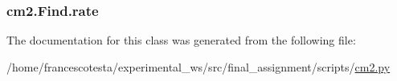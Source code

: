 \subsubsection[{\texorpdfstring{rate}{rate}}]{\setlength{\rightskip}{0pt plus 5cm}cm2.\+Find.\+rate\hspace{0.3cm}{\ttfamily [static]}}\hypertarget{classcm2_1_1Find_a7d73b556208fcf41081fb23ae0e1b262}{}\label{classcm2_1_1Find_a7d73b556208fcf41081fb23ae0e1b262}


The documentation for this class was generated from the following file\+:\begin{DoxyCompactItemize}
\item 
/home/francescotesta/experimental\+\_\+ws/src/final\+\_\+assignment/scripts/\hyperlink{cm2_8py}{cm2.\+py}\end{DoxyCompactItemize}
